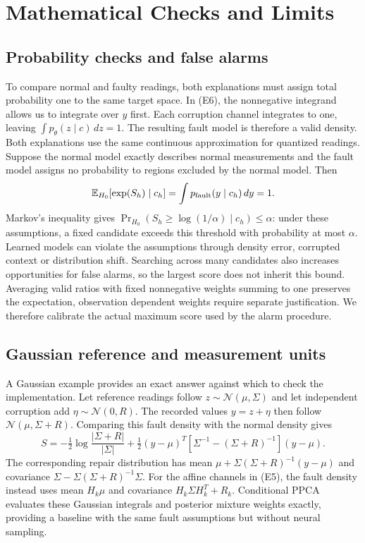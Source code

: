 \documentclass[conference]{IEEEtran}
\newcommand{\E}{\mathbb{E}}
\newcommand{\1}{\mathbf{1}}
\begin{document}
\section{Mathematical Checks and Limits}

\subsection{Probability checks and false alarms}
To compare normal and faulty readings, both explanations must assign total probability one to the same target space. In (E6), the nonnegative integrand allows us to integrate over $y$ first. Each corruption channel integrates to one, leaving $\int p_\theta(z\mid c)\,dz=1$. The resulting fault model is therefore a valid density. Both explanations use the same continuous approximation for quantized readings.
Suppose the normal model exactly describes normal measurements and the fault model assigns no probability to regions excluded by the normal model. Then
\[
 \E_{H_0}[\exp(S_h)\mid c_h]
 =\int p_{\rm fault}(y\mid c_h)\,dy=1.
\]
Markov's inequality gives
$\Pr_{H_0}(S_h\geq\log(1/\alpha)\mid c_h)\leq\alpha$:
under these assumptions, a fixed candidate exceeds this threshold with probability at most $\alpha$. Learned models can violate the assumptions through density error, corrupted context or distribution shift. Searching across many candidates also increases opportunities for false alarms, so the largest score does not inherit this bound. Averaging valid ratios with fixed nonnegative weights summing to one preserves the expectation, observation dependent weights require separate justification. We therefore calibrate the actual maximum score used by the alarm procedure.

\subsection{Gaussian reference and measurement units}
A Gaussian example provides an exact answer against which to check the implementation. Let reference readings follow $z\sim\mathcal N(\mu,\Sigma)$ and let independent corruption add $\eta\sim\mathcal N(0,R)$. The recorded values $y=z+\eta$ then follow $\mathcal N(\mu,\Sigma+R)$. Comparing this fault density with the normal density gives
\[
 S=-\tfrac12\log\frac{|\Sigma+R|}{|\Sigma|}
 +\tfrac12(y-\mu)^T
 [\Sigma^{-1}-(\Sigma+R)^{-1}](y-\mu).
\]
The corresponding repair distribution has mean
$\mu+\Sigma(\Sigma+R)^{-1}(y-\mu)$
and covariance
$\Sigma-\Sigma(\Sigma+R)^{-1}\Sigma$.
For the affine channels in (E5), the fault density instead uses mean $H_k\mu$ and covariance $H_k\Sigma H_k^T+R_k$. Conditional PPCA evaluates these Gaussian integrals and posterior mixture weights exactly, providing a baseline with the same fault assumptions but without neural sampling.
\end{document}
